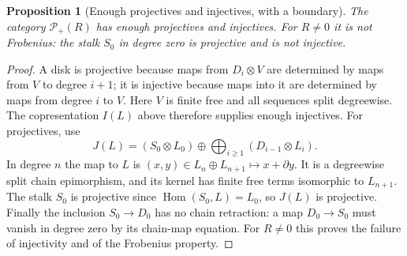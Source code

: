 \documentclass[11pt,a4paper]{article}
\newtheorem{proposition}[theorem]{Proposition}
\theoremstyle{definition}
\newcommand{\Hom}{\operatorname{Hom}}
\begin{document}
\begin{proposition}[Enough projectives and injectives, with a boundary]
\label{prop:nonnegative}
The category $\mathcal P_+(R)$ has enough projectives and injectives.
For $R\ne0$ it is not Frobenius: the stalk $S_0$ in degree zero is
projective and is not injective.
\end{proposition}
\begin{proof}
A disk is projective because maps from $D_i\otimes V$ are determined
by maps from $V$ to degree $i+1$; it is injective because maps into
it are determined by maps from degree $i$ to $V$. Here $V$ is
finite free and all sequences split degreewise. The copresentation
$I(L)$ above therefore supplies enough injectives. For projectives,
use
\[
 J(L)=(S_0\otimes L_0)\oplus
       \bigoplus_{i\ge1}(D_{i-1}\otimes L_i).
\]
In degree $n$ the map to $L$ is
$(x,y)\in L_n\oplus L_{n+1}\mapsto x+\partial y$.
It is a degreewise split chain epimorphism, and its kernel has finite
free terms isomorphic to $L_{n+1}$. The stalk $S_0$ is projective
since $\Hom(S_0,L)=L_0$, so $J(L)$ is projective. Finally the
inclusion $S_0\to D_0$ has no chain retraction: a map $D_0\to S_0$
must vanish in degree zero by its chain-map equation. For $R\ne0$
this proves the failure of injectivity and of the Frobenius property.
\end{proof}
\end{document}
